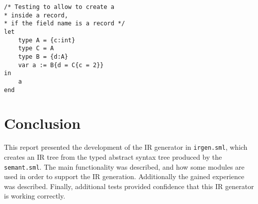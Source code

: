 \documentclass{article}
\begin{document}
\begin{lstlisting}[frame=single]
/* Testing to allow to create a
* inside a record,
* if the field name is a record */
let
	type A = {c:int}
	type C = A
	type B = {d:A}
	var a := B{d = C{c = 2}}
in
	a
end
\end{lstlisting}


\section{Conclusion}
This report presented the development of the IR generator in \texttt{irgen.sml}, which creates an IR tree from the typed abstract syntax tree produced by the \texttt{semant.sml}. The main functionality was described, and how some modules are used in order to support the IR generation. Additionally the gained experience was described. Finally, additional tests provided confidence that this IR generator is working correctly.
\end{document}
